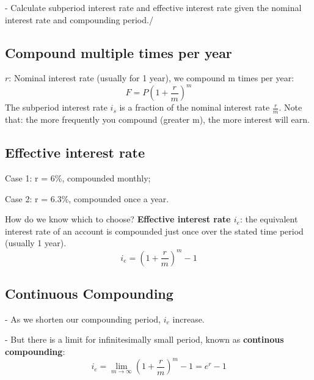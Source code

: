 \documentclass{article}
\begin{document}
- Calculate subperiod interest rate and effective interest rate given the nominal interest rate and compounding period./

\subsection*{Compound multiple times per year}

$r$: Nominal interest rate (usually for 1 year), we compound m times per year:
\[F = P(1+\frac{r}{m})^m\]
The subperiod interest rate $i_s$ is a fraction of the nominal interest rate $\frac{r}{m}$.
Note that: the more frequently you compound (greater m), the more interest will earn. 


\subsection*{Effective interest rate}

Case 1: r = 6\%, compounded monthly; 

Case 2: r = 6.3\%, compounded once a year.

How do we know which to choose?
\textbf{Effective interest rate $i_e$}: the equivalent interest rate of an account is compounded just once over the stated time period (usually 1 year).  
\[ i_e = (1+\frac{r}{m})^m - 1\]

\subsection*{Continuous Compounding}
- As we shorten our compounding period, $i_e$ increase.

- But there is a limit for infinitesimally small period, known as \textbf{continous compounding}:
\[i_e = \lim_{m\to\infty}(1 +\frac{r}{m})^m - 1 = e^r -1\]
\end{document}
